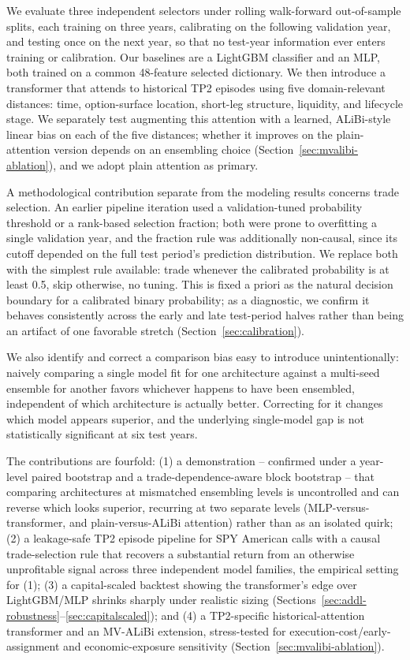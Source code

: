 \documentclass[sigconf,review,anonymous]{acmart}
\begin{document}
We evaluate three independent selectors under rolling walk-forward out-of-sample splits, each training on three years, calibrating on the following validation year, and testing once on the next year, so that no test-year information ever enters training or calibration. Our baselines are a LightGBM classifier and an MLP, both trained on a common 48-feature selected dictionary. We then introduce a transformer that attends to historical TP2 episodes using five domain-relevant distances: time, option-surface location, short-leg structure, liquidity, and lifecycle stage. We separately test augmenting this attention with a learned, ALiBi-style linear bias on each of the five distances; whether it improves on the plain-attention version depends on an ensembling choice (Section~\ref{sec:mvalibi-ablation}), and we adopt plain attention as primary.

A methodological contribution separate from the modeling results concerns trade selection. An earlier pipeline iteration used a validation-tuned probability threshold or a rank-based selection fraction; both were prone to overfitting a single validation year, and the fraction rule was additionally non-causal, since its cutoff depended on the full test period's prediction distribution. We replace both with the simplest rule available: trade whenever the calibrated probability is at least 0.5, skip otherwise, no tuning. This is fixed a priori as the natural decision boundary for a calibrated binary probability; as a diagnostic, we confirm it behaves consistently across the early and late test-period halves rather than being an artifact of one favorable stretch (Section~\ref{sec:calibration}).

We also identify and correct a comparison bias easy to introduce unintentionally: naively comparing a single model fit for one architecture against a multi-seed ensemble for another favors whichever happens to have been ensembled, independent of which architecture is actually better. Correcting for it changes which model appears superior, and the underlying single-model gap is not statistically significant at six test years.

The contributions are fourfold: (1) a demonstration -- confirmed under a year-level paired bootstrap and a trade-dependence-aware block bootstrap -- that comparing architectures at mismatched ensembling levels is uncontrolled and can reverse which looks superior, recurring at two separate levels (MLP-versus-transformer, and plain-versus-ALiBi attention) rather than as an isolated quirk; (2) a leakage-safe TP2 episode pipeline for SPY American calls with a causal trade-selection rule that recovers a substantial return from an otherwise unprofitable signal across three independent model families, the empirical setting for (1); (3) a capital-scaled backtest showing the transformer's edge over LightGBM/MLP shrinks sharply under realistic sizing (Sections~\ref{sec:addl-robustness}--\ref{sec:capitalscaled}); and (4) a TP2-specific historical-attention transformer and an MV-ALiBi extension, stress-tested for execution-cost/early-assignment and economic-exposure sensitivity (Section~\ref{sec:mvalibi-ablation}).
\end{document}
